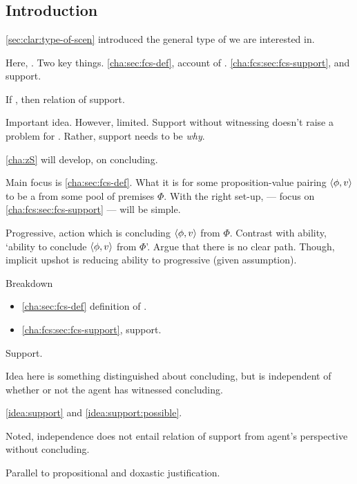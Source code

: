 \chapter{}
\label{cha:fcs}

\nocite{Ryle:1946tu}

\section{Introduction}
\label{cha:fcs:sec:introduction}

\begin{note}
  \autoref{sec:clar:type-of-scen} introduced the general type of \scen{} we are interested in.

  Here, .
  Two key things.
  \autoref{cha:sec:fcs-def}, account of .
  \autoref{cha:fcs:sec:fcs-support},  and support.

  If \fc{}, then relation of support.

  Important idea.
  However, limited.
  Support without witnessing doesn't raise a problem for \issueConstraint{}.
  Rather, support needs to be \emph{why}.

  \autoref{cha:zS} will develop,  on concluding.

  Main focus is \autoref{cha:sec:fcs-def}.
  What it is for some proposition-value pairing \(\langle \phi, v \rangle\) to be a \fc{} from some pool of premises \(\Phi\).
  With the right set-up, \support{} --- focus on \autoref{cha:fcs:sec:fcs-support} --- will be simple.

  Progressive, action which is concluding \(\langle \phi, v \rangle\) from \(\Phi\).
  Contrast with ability, `ability to conclude \(\langle \phi, v \rangle\) from \(\Phi\)'.
  Argue that there is no clear path.
  Though, implicit upshot is reducing ability to progressive (given assumption).
\end{note}

\begin{note}
  Breakdown
  \begin{itemize}
  \item
    \autoref{cha:sec:fcs-def} definition of .
  \item
    \autoref{cha:fcs:sec:fcs-support}, support.
  \end{itemize}
\end{note}

\begin{note}
  Support.

  Idea here is something distinguished about concluding, but is independent of whether or not the agent has witnessed concluding.

  \autoref{idea:support} and \autoref{idea:support:possible}.

  Noted, independence does not entail relation of support from agent's perspective without concluding.

  Parallel to propositional and doxastic justification.
\end{note}

